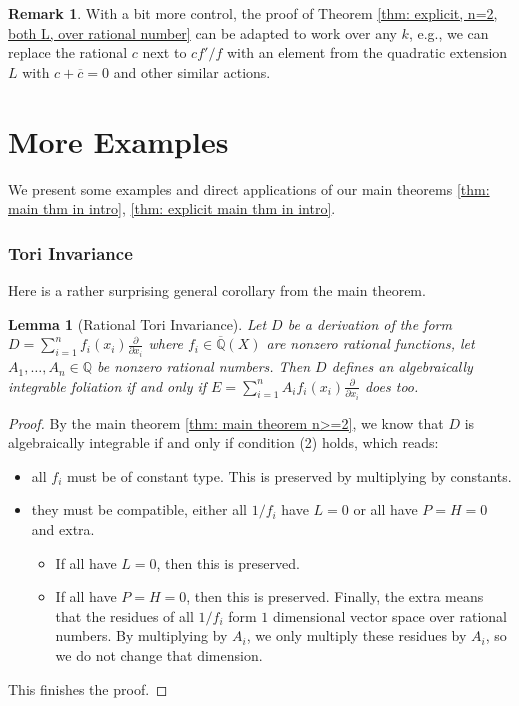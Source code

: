\documentclass{amsart}
\newtheorem{lemma}[thm]{Lemma}
\theoremstyle{definition}
\newtheorem{remark}[thm]{Remark}
\begin{document}
\begin{remark}
    With a bit more control, the proof of Theorem \ref{thm: explicit, n=2, both L, over rational number} can be adapted to work over any $k$, e.g., we can replace the rational $c$ next to $cf'/f$ with an element from the quadratic extension $L$ with $c+\overline{c}=0$ and other similar actions.
\end{remark}


\section{More Examples}
We present some examples and direct applications of our main theorems \ref{thm: main thm in intro}, \ref{thm: explicit main thm in intro}.

\subsubsection{Tori Invariance} Here is a rather surprising general corollary from the main theorem.

\begin{lemma}[Rational Tori Invariance]\label{lem: toric invariance}
    Let $D$ be a derivation of the form $D= \sum_{i=1}^n f_i(x_i)\frac{\partial}{\partial x_i}$ where $f_i\in \overline{\mathbb{Q}}(X)$ are nonzero rational functions, let $A_1,\ldots,A_n\in \mathbb{Q}$ be nonzero rational numbers. Then $D$ defines an algebraically integrable foliation if and only if
    $E=\sum_{i=1}^n A_if_i(x_i)\frac{\partial}{\partial x_i}$ does too.
\end{lemma}

\begin{proof}
    By the main theorem \ref{thm: main theorem n>=2}, we know that $D$ is algebraically integrable if and only if condition (2) holds, which reads: 
    \begin{itemize}
        \item all $f_i$ must be of constant type. This is preserved by multiplying by constants.
        \item they must be compatible, either all $1/f_i$ have $L=0$ or all have $P=H=0$ and extra.
        \begin{itemize}
            \item If all have $L=0$, then this is preserved.
            \item If all have $P=H=0$, then this is preserved. Finally, the extra means that the residues of all $1/f_i$ form $1$ dimensional vector space over rational numbers. By multiplying by $A_i$, we only multiply these residues by $A_i$, so we do not change that dimension.
        \end{itemize}
    \end{itemize}
    This finishes the proof.
\end{proof}
\end{document}
